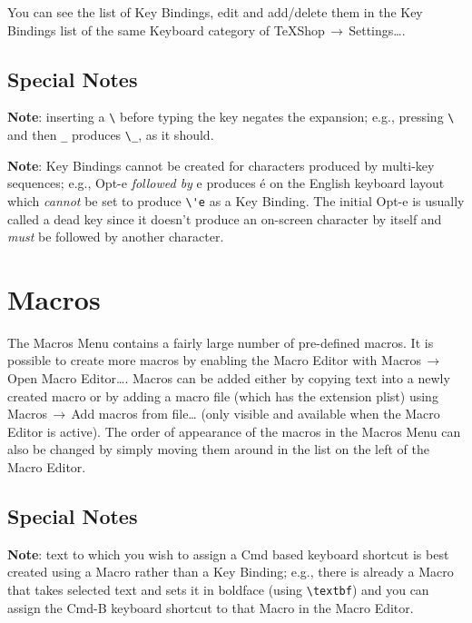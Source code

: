 \documentclass[11pt]{article}
\newcommand{\mnu}[1]{\textsf{#1}}
\newcommand{\cmd}[1]{\textsf{#1}}
\newcommand{\To}{\,\(\to\)\,}
\begin{document}
You can see the list of \cmd{Key Bindings}, edit and add/delete them in the \mnu{Key Bindings} list of the same \mnu{Keyboard} category of \mnu{TeXShop}\To\mnu{Settings…}.

\subsection{Special Notes}

\textbf{Note}: inserting a \verb"\" before typing the key negates the expansion; e.g., pressing \verb"\" and then \verb"_" produces \verb"\_", as it should.
 
\noindent \textbf{Note}: \cmd{Key Bindings} cannot be created for characters produced by multi-key sequences; e.g., \cmd{Opt-e} \emph{followed by} e produces é on the English keyboard layout which \emph{cannot} be set to produce \verb"\'e" as a \cmd{Key Binding}. The initial \cmd{Opt-e} is usually called a \cmd{dead key} since it doesn't produce an on-screen character by itself and \emph{must} be followed by another character.

\section{\cmd{Macros}}

The \mnu{Macros} Menu contains a fairly large number of pre-defined macros. It is possible to create more macros by enabling the Macro Editor with \mnu{Macros}\To\mnu{Open Macro Editor…}. Macros can be added either by copying text into a newly created macro or by adding a macro file (which has the extension \cmd{plist}) using \mnu{Macros}\To\mnu{Add macros from file…} (only visible and available when the Macro Editor is active). The order of appearance of the macros in the \cmd{Macros} Menu can also be changed by simply moving them around in the list on the left of the \cmd{Macro Editor}.

\subsection{Special Notes}

\textbf{Note}: text to which you wish to assign a \cmd{Cmd} based keyboard shortcut is best created using a \cmd{Macro} rather than a \cmd{Key Binding}; e.g., there is already a \cmd{Macro} that takes selected text and sets it  in boldface (using \verb"\textbf") and you can assign the \cmd{Cmd-B} keyboard shortcut to that \cmd{Macro} in the \cmd{Macro Editor}.
\end{document}
